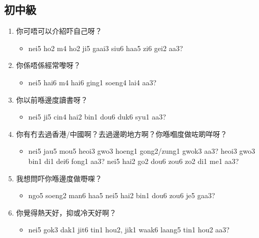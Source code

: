 \documentclass[12pt,a4paper]{leaflet}
\begin{document}
\begin{tcolorbox}[enhanced, breakable, skin first=enhanced, skin middle=enhanced, skin last=enhanced,colback=LightYellow!20!white, colframe=LightYellow!50!black, boxrule=0.5mm]
\subsection*{初中級}
\begin{enumerate}[label={},leftmargin=0pt, itemindent=0pt]
\item \LARGE{你可唔可以介紹吓自己呀？}
\begin{itemize}[label={},leftmargin=0pt, itemindent=0pt]
\item \footnotesize\textsf{nei5 ho2 m4 ho2 ji5 gaai3 siu6 haa5 zi6 gei2 aa3?}
\end{itemize}
\item \LARGE{你係唔係經常嚟呀？}
\begin{itemize}[label={},leftmargin=0pt, itemindent=0pt]
\item \footnotesize\textsf{nei5 hai6 m4 hai6 ging1 soeng4 lai4 aa3?}
\end{itemize}
\item \LARGE{你以前喺邊度讀書呀？}
\begin{itemize}[label={},leftmargin=0pt, itemindent=0pt]
\item \footnotesize\textsf{nei5 ji5 cin4 hai2 bin1 dou6 duk6 syu1 aa3?}
\end{itemize}
\item \LARGE{你有冇去過香港/中國啊？去過邊啲地方啊？你喺嗰度做咗啲咩呀？}
\begin{itemize}[label={},leftmargin=0pt, itemindent=0pt]
\item \footnotesize\textsf{nei5 jau5 mou5 heoi3 gwo3 hoeng1 gong2/zung1 gwok3 aa3? heoi3 gwo3 bin1 di1 dei6 fong1 aa3? nei5 hai2 go2 dou6 zou6 zo2 di1 me1 aa3?}
\end{itemize}
\item \LARGE{我想問吓你喺邊度做嘢㗎？}
\begin{itemize}[label={},leftmargin=0pt, itemindent=0pt]
\item \footnotesize\textsf{ngo5 soeng2 man6 haa5 nei5 hai2 bin1 dou6 zou6 je5 gaa3?}
\end{itemize}
\item \LARGE{你覺得熱天好，抑或冷天好啊？}
\begin{itemize}[label={},leftmargin=0pt, itemindent=0pt]
\item \footnotesize\textsf{nei5 gok3 dak1 jit6 tin1 hou2, jik1 waak6 laang5 tin1 hou2 aa3?}

\end{itemize}
\end{enumerate}
\end{tcolorbox}
\end{document}
